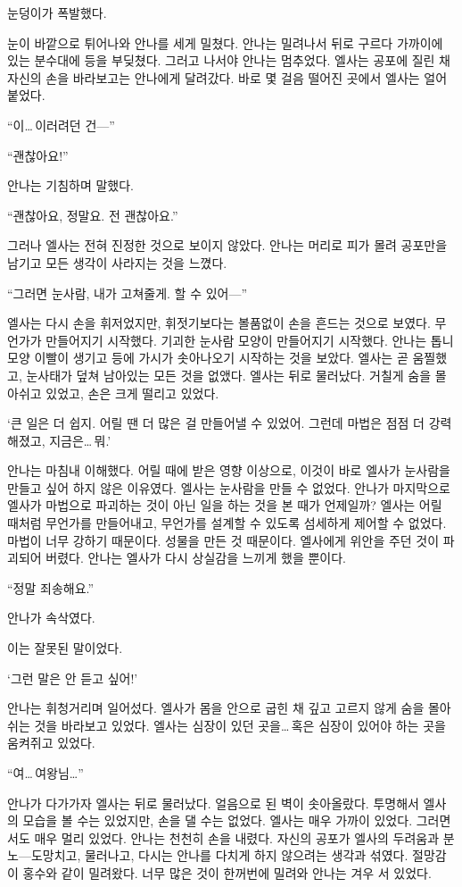 눈덩이가 폭발했다.

눈이 바깥으로 튀어나와 안나를 세게 밀쳤다. 안나는 밀려나서 뒤로 구르다 가까이에 있는 분수대에 등을 부딪쳤다. 그러고 나서야 안나는 멈추었다. 엘사는 공포에 질린 채 자신의 손을 바라보고는 안나에게 달려갔다. 바로 몇 걸음 떨어진 곳에서 엘사는 얼어붙었다.

``이\ldots\,이러려던 건—''

``괜찮아요!''

안나는 기침하며 말했다.

``괜찮아요, 정말요. 전 괜찮아요.''

그러나 엘사는 전혀 진정한 것으로 보이지 않았다. 안나는 머리로 피가 몰려 공포만을 남기고 모든 생각이 사라지는 것을 느꼈다.

``그러면 눈사람, 내가 고쳐줄게. 할 수 있어—''

엘사는 다시 손을 휘저었지만, 휘젓기보다는 볼품없이 손을 흔드는 것으로 보였다. 무언가가 만들어지기 시작했다. 기괴한 눈사람 모양이 만들어지기 시작했다. 안나는 톱니 모양 이빨이 생기고 등에 가시가 솟아나오기 시작하는 것을 보았다. 엘사는 곧 움찔했고, 눈사태가 덮쳐 남아있는 모든 것을 없앴다. 엘사는 뒤로 물러났다. 거칠게 숨을 몰아쉬고 있었고, 손은 크게 떨리고 있었다.

`큰 일은 더 쉽지. 어릴 땐 더 많은 걸 만들어낼 수 있었어. 그런데 마법은 점점 더 강력해졌고, 지금은\ldots\,뭐.'

안나는 마침내 이해했다. 어릴 때에 받은 영향 이상으로, 이것이 바로 엘사가 눈사람을 만들고 싶어 하지 않은 이유였다. 엘사는 눈사람을 만들 수 없었다. 안나가 마지막으로 엘사가 마법으로 파괴하는 것이 아닌 일을 하는 것을 본 때가 언제일까? 엘사는 어릴 때처럼 무언가를 만들어내고, 무언가를 설계할 수 있도록 섬세하게 제어할 수 없었다. 마법이 너무 강하기 때문이다. 성물을 만든 것 때문이다. 엘사에게 위안을 주던 것이 파괴되어 버렸다. 안나는 엘사가 다시 상실감을 느끼게 했을 뿐이다.

``정말 죄송해요.''

안나가 속삭였다.

이는 잘못된 말이었다.

`그런 말은 안 듣고 싶어!'

안나는 휘청거리며 일어섰다. 엘사가 몸을 안으로 굽힌 채 깊고 고르지 않게 숨을 몰아쉬는 것을 바라보고 있었다. 엘사는 심장이 있던 곳을\ldots\,혹은 심장이 있어야 하는 곳을 움켜쥐고 있었다.

``여\ldots\,여왕님\ldots''

안나가 다가가자 엘사는 뒤로 물러났다. 얼음으로 된 벽이 솟아올랐다. 투명해서 엘사의 모습을 볼 수는 있었지만, 손을 댈 수는 없었다. 엘사는 매우 가까이 있었다. 그러면서도 매우 멀리 있었다. 안나는 천천히 손을 내렸다. 자신의 공포가 엘사의 두려움과 분노—도망치고, 물러나고, 다시는 안나를 다치게 하지 않으려는 생각과 섞였다. 절망감이 홍수와 같이 밀려왔다. 너무 많은 것이 한꺼번에 밀려와 안나는 겨우 서 있었다.

